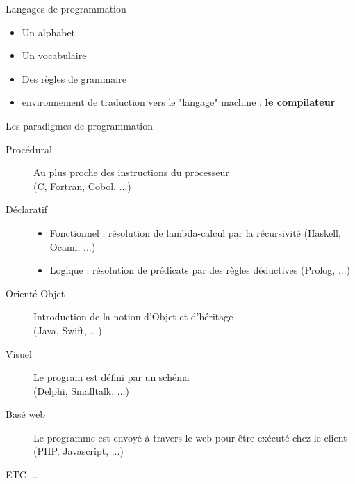 \begin{frame}{Langages de programmation}
    \begin{itemize}
        \item Un alphabet
        \item Un vocabulaire
        \item Des règles de grammaire
        \item environnement de traduction vers le "langage" machine : \textbf{le compilateur}
    \end{itemize}
\end{frame}

\begin{frame}{Les paradigmes de programmation}
    \begin{description}
        \item [Procédural] Au plus proche des instructions du processeur \\(C, Fortran, Cobol, ...)
        \item [Déclaratif]
        \begin{itemize}
            \item Fonctionnel : résolution de lambda-calcul par la récursivité (Haskell, Ocaml, ...)
            \item Logique : résolution de prédicats par des règles déductives (Prolog, ...)
        \end{itemize}
        \item [Orienté Objet] Introduction de la notion d'Objet et d'héritage \\(Java, Swift, ...)
        \item [Visuel] Le program est défini par un schéma \\(Delphi, Smalltalk, ...)
        \item [Basé web] Le programme est envoyé à travers le web pour être exécuté chez le client (PHP, Javascript, ...)
        \item [ETC ...]
    \end{description}
\end{frame}
